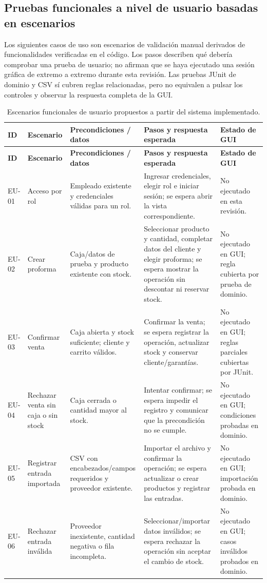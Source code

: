\subsection{Pruebas funcionales a nivel de usuario basadas en escenarios}
\label{subsec:escenarios}

Los siguientes casos de uso son escenarios de validación manual derivados de funcionalidades verificadas en el código. Los pasos describen qué debería comprobar una prueba de usuario; no afirman que se haya ejecutado una sesión gráfica de extremo a extremo durante esta revisión. Las pruebas JUnit de dominio y CSV sí cubren reglas relacionadas, pero no equivalen a pulsar los controles y observar la respuesta completa de la GUI.

\begin{longtable}{|p{0.85cm}|p{2.1cm}|p{3.3cm}|p{4.0cm}|p{2.4cm}|}
\caption{Escenarios funcionales de usuario propuestos a partir del sistema implementado.}
\label{tab:escenarios-usuario}\\
\hline
\textbf{ID} & \textbf{Escenario} & \textbf{Precondiciones / datos} & \textbf{Pasos y respuesta esperada} & \textbf{Estado de GUI}\\
\hline
\endfirsthead
\hline
\textbf{ID} & \textbf{Escenario} & \textbf{Precondiciones / datos} & \textbf{Pasos y respuesta esperada} & \textbf{Estado de GUI}\\
\hline
\endhead
EU-01 & Acceso por rol & Empleado existente y credenciales válidas para un rol. & Ingresar credenciales, elegir rol e iniciar sesión; se espera abrir la vista correspondiente. & No ejecutado en esta revisión.\\
\hline
EU-02 & Crear proforma & Caja/datos de prueba y producto existente con stock. & Seleccionar producto y cantidad, completar datos del cliente y elegir proforma; se espera mostrar la operación sin descontar ni reservar stock. & No ejecutado en GUI; regla cubierta por prueba de dominio.\\
\hline
EU-03 & Confirmar venta & Caja abierta y stock suficiente; cliente y carrito válidos. & Confirmar la venta; se espera registrar la operación, actualizar stock y conservar cliente/garantías. & No ejecutado en GUI; reglas parciales cubiertas por JUnit.\\
\hline
EU-04 & Rechazar venta sin caja o sin stock & Caja cerrada o cantidad mayor al stock. & Intentar confirmar; se espera impedir el registro y comunicar que la precondición no se cumple. & No ejecutado en GUI; condiciones probadas en dominio.\\
\hline
EU-05 & Registrar entrada importada & CSV con encabezados/campos requeridos y proveedor existente. & Importar el archivo y confirmar la operación; se espera actualizar o crear productos y registrar las entradas. & No ejecutado en GUI; importación probada en dominio.\\
\hline
EU-06 & Rechazar entrada inválida & Proveedor inexistente, cantidad negativa o fila incompleta. & Seleccionar/importar datos inválidos; se espera rechazar la operación sin aceptar el cambio de stock. & No ejecutado en GUI; casos inválidos probados en dominio.\\
\hline
\end{longtable}

